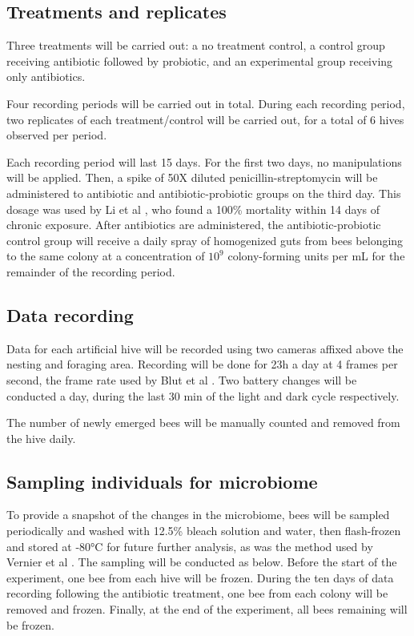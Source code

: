 \documentclass[11pt]{article}
\begin{document}
        \subsection{Treatments and replicates}
            Three treatments will be carried out: a no treatment control,
            a control group receiving antibiotic followed by probiotic,
            and an experimental group receiving only antibiotics.

            Four recording periods will be carried out in total.
            During each recording period,
            two replicates of each treatment/control will be carried out,
            for a total of 6 hives observed per period.

            Each recording period will last 15 days.
            For the first two days, no manipulations will be applied.
            Then, a spike of 50X diluted penicillin-streptomycin will be administered to antibiotic and antibiotic-probiotic groups on the third day.
            This dosage was used by Li et al
            \cite{li2017new},
            who found a 100\% mortality within 14 days of chronic exposure.
            After antibiotics are administered,
            the antibiotic-probiotic control group will receive a daily spray of homogenized guts from bees belonging to the same colony at a concentration of \(10^9\)
            colony-forming units per mL for the remainder of the recording period.
            
       \subsection{Data recording}
            Data for each artificial hive will be recorded using two cameras affixed above the nesting and foraging area.
            Recording will be done for 23h a day at 4 frames per second, 
            the frame rate used by Blut et al
            \cite{blut2017automated}.
            Two battery changes will be conducted a day,
            during the last 30 min of the light and dark cycle respectively.

            The number of newly emerged bees will be manually counted and removed from the hive daily.
        
        \subsection{Sampling individuals for microbiome}
            To provide a snapshot of the changes in the microbiome, bees will be sampled periodically and washed with 12.5\% bleach solution and water,
            then flash-frozen and stored at \ang{-80}C for future further analysis,
            as was the method used by Vernier et al
            \cite{vernier2020gut}.
            The sampling will be conducted as below. Before the start of the experiment, one bee from each hive will be frozen.
            During the ten days of data recording following the antibiotic treatment, one bee from each colony will be removed and frozen.
            Finally, at the end of the experiment, all bees remaining will be frozen.
\end{document}
